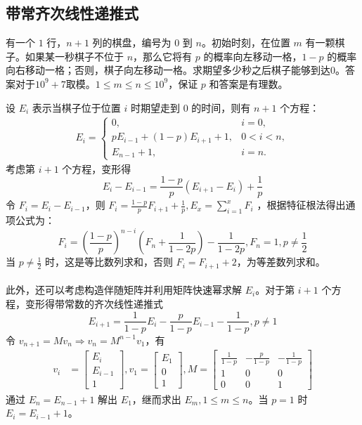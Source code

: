 \documentclass[12pt,a4paper]{article}
\begin{document}
\subsection{带常齐次线性递推式}
\begin{mdframed}[leftline=true, linewidth=2pt, linecolor=gray]
	有一个 $1$ 行，$n+1$ 列的棋盘，编号为 $0$ 到 $n$。初始时刻，在位置 $m$ 有一颗棋子。如果某一秒棋子不位于 $n$，那么它将有 $p$ 的概率向左移动一格，$1-p$ 的概率向右移动一格；否则，棋子向左移动一格。求期望多少秒之后棋子能够到达$0$。答案对于$10^9+7$取模。$1\le m\le n\le 10^9$，保证 $p$ 和答案是有理数。
\end{mdframed}
设 $E_i$ 表示当棋子位于位置 $i$ 时期望走到 $0$ 的时间，则有 $n+1$ 个方程：
\begin{align*}
	E_i = 
	\begin{cases}
		0, & i = 0, \\[6pt]
		pE_{i-1}+(1-p)E_{i+1}+1, & 0 < i < n, \\[6pt]
		E_{n-1}+1, & i = n.
	\end{cases}
\end{align*}
考虑第 $i+1$ 个方程，变形得 
\begin{equation*}
	\displaystyle E_i-E_{i-1}=\frac{1-p}{p}(E_{i+1}-E_i)+\frac{1}{p}
\end{equation*}
令 $F_i=E_i-E_{i-1}$，则 $\displaystyle F_i=\frac{1-p}{p}F_{i+1}+\frac{1}{p}, E_x=\sum_{i=1}^{x}F_i$ ，根据特征根法得出通项公式为： 
\begin{equation*}
	\displaystyle F_i=(\frac{1-p}{p})^{n-i}(F_n+\frac{1}{1-2p})-\frac{1}{1-2p} , F_n=1,p\ne\frac{1}{2}
\end{equation*}
当 $\displaystyle p\ne\frac{1}{2}$ 时，这是等比数列求和，否则 $F_i=F_{i+1}+2$，为等差数列求和。\\\\
此外，还可以考虑构造伴随矩阵并利用矩阵快速幂求解 $E_i$。对于第 $i+1$ 个方程，变形得带常数的齐次线性递推式 \begin{equation*}
	\displaystyle E_{i+1}=\frac{1}{1-p}E_{i}-\frac{p}{1-p}E_{i-1}-\frac{1}{1-p},p\ne1
\end{equation*}
令 $v_{n+1}=Mv_n\Rightarrow v_n=M^{n-1}v_1$，有
\begin{align*}
	\displaystyle v_i&=\begin{bmatrix}E_i\\E_{i-1}\\1\end{bmatrix},v_1=\begin{bmatrix}E_1\\0\\1\end{bmatrix},M=\begin{bmatrix}\frac{1}{1-p} & -\frac{p}{1-p} & -\frac{1}{1-p}\\1 & 0 & 0\\0 & 0 & 1\end{bmatrix}
\end{align*}
通过 $E_n=E_{n-1}+1$ 解出 $E_1$，继而求出 $E_m,1\le m\le n$。当 $p=1$ 时 $E_i=E_{i-1}+1$。
\end{document}
